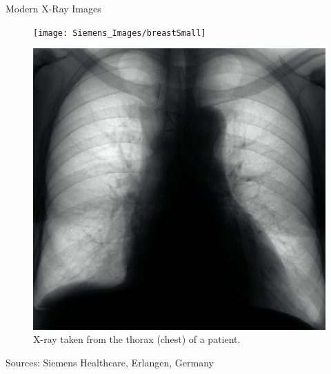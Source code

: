 \begin{frame}{Modern X-Ray Images}
    \begin{figure}
        \centering
        \begin{minipage}[t]{0.27\columnwidth}
            \texttt{[image: Siemens\_Images/breastSmall]}%
            \caption{Breast X-ray. Note the clearly visible structures in the soft-tissue.}
            \label{fig_chap:xray_breastExample}
        \end{minipage}
        \hspace{2cm}
        \begin{minipage}[t]{0.415\columnwidth}
            \includegraphics[height=0.7\textheight]{Siemens_Images/150_7}%
            \caption{X-ray taken from the thorax (chest) of a patient.}
            \label{fig_chap:xray_CTexample}
        \end{minipage}%
    \end{figure}
    \vspace{-0.5cm}
    \begin{flushright}
        \scriptsize Sources: Siemens Healthcare, Erlangen, Germany
    \end{flushright}
\end{frame}

